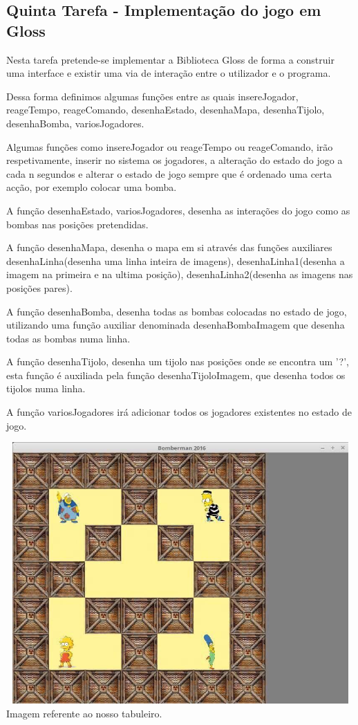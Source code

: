 \documentclass[a4paper]{article}
\begin{document}
\subsection{Quinta Tarefa - Implementação do jogo em Gloss}
\label{subsec:tarefa5sol}

Nesta tarefa pretende-se implementar a Biblioteca Gloss de forma a construir uma interface e existir uma via de interação entre o utilizador e o programa.

Dessa forma definimos algumas funções entre as quais insereJogador, reageTempo, reageComando, desenhaEstado, desenhaMapa, desenhaTijolo, desenhaBomba, variosJogadores.

Algumas funções como insereJogador ou reageTempo ou reageComando, irão respetivamente, inserir no sistema os jogadores, a alteração do estado do jogo a cada n segundos e alterar o estado de jogo sempre que é ordenado uma certa acção, por exemplo colocar uma bomba.

A função desenhaEstado, variosJogadores, desenha as interações do jogo como as bombas nas posições pretendidas.

A função desenhaMapa, desenha o mapa em si através das funções auxiliares desenhaLinha(desenha uma linha inteira de imagens), desenhaLinha1(desenha a imagem na primeira e na ultima posição), desenhaLinha2(desenha as imagens nas posições pares).

A função desenhaBomba, desenha todas as bombas colocadas no estado de jogo, utilizando uma função auxiliar denominada desenhaBombaImagem que desenha todas as bombas numa linha.

A função desenhaTijolo, desenha um tijolo nas posições onde se encontra um '?', esta função é auxiliada pela função desenhaTijoloImagem, que desenha todos os tijolos numa linha.

A função variosJogadores irá adicionar todos os jogadores existentes no estado de jogo.

\begin{center}
\includegraphics[width=15cm, height=10cm]{tabuleiro}
Imagem referente ao nosso tabuleiro.
\end{center}
\end{document}
